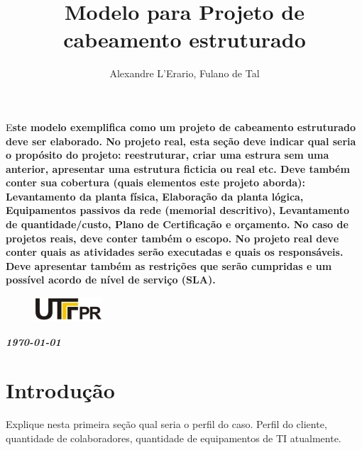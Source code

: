 \documentclass[	DIV=calc,%
							paper=a4,%
							fontsize=12pt,%
							onecolumn]{scrartcl}	 					%
\title{Modelo para Projeto de cabeamento estruturado}					%
\author{Alexandre L'Erario, Fulano de Tal }  	%
\date{}																				%
\newcommand{\initial}[1]{%
     \lettrine[lines=3,lhang=0.3,nindent=0em]{
     				\color{DarkGoldenrod}
     				{\textsf{#1}}}{}}
\begin{document}
\maketitle
\thispagestyle{fancy} 	
\thispagestyle{empty}		%




\initial{E}\textbf{ste modelo exemplifica como um projeto de cabeamento estruturado deve ser elaborado. No projeto real,
	esta seção deve indicar qual seria o propósito do projeto: reestruturar, criar uma estrura sem uma anterior, apresentar uma estrutura ficticia ou real  etc. Deve também conter sua cobertura (quais elementos este projeto aborda): Levantamento da planta física, Elaboração da planta lógica, Equipamentos passivos da rede (memorial descritivo), Levantamento de quantidade/custo, Plano de Certificação e orçamento.
	No caso de projetos reais, deve conter também o escopo. No projeto real deve conter quais as atividades serão executadas e quais os responsáveis. Deve apresentar também as restrições que serão cumpridas e um possível acordo de nível de serviço (SLA).}

\begin{figure}
	\centering
	\includegraphics{utfpr}
\end{figure}

\vspace{3cm}
\centerline{\textit{\textbf{\today}}}

\clearpage
    \renewcommand*\listfigurename{Lista de figuras}
\listoffigures

\renewcommand*\listtablename{Lista de tabelas}
\listoftables




\clearpage
\renewcommand{\contentsname}{Sumário}
\tableofcontents
\clearpage

\section{Introdução}
Explique nesta primeira seção qual seria o perfil do caso. Perfil do cliente, quantidade de colaboradores, quantidade de equipamentos de TI atualmente.
\end{document}
